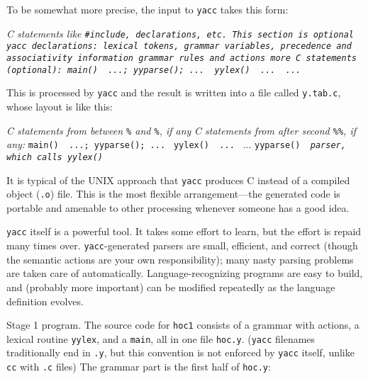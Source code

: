 To be somewhat more precise, the input to {\tt yacc} takes
this form:

\begincode
\it C statements like \tt#include\it, declarations, etc. This section is optional\tt
\begingroup\it yacc declarations: lexical tokens, grammar variables,
\quad precedence and associativity information\endgroup
\begingroup\it grammar rules and actions\endgroup
\begingroup\it more C statements (optional):\endgroup
main() { ...; yyparse(); ... }
yylex() { ... }
...
\endcode

\noindent
This is processed by {\tt yacc} and the result is written into
a file called {\tt y.tab.c}, whose layout is like this:

\smallbreak
\begingroup
\obeylines
{\it C statements from between {\tt\%\ocb} and {\tt\%\ccb}, if any}
{\it C statements from after second {\tt\%\%}, if any:}
{\tt main() \ocb\ ...; yyparse(); ... \ccb}
{\tt yylex() \ocb\ ... \ccb}
...
{\tt yyparse() \ocb\ \it parser, which calls \tt yylex() \ccb}
\endgroup
\smallskip

It is typical of the {\sc UNIX} approach that {\tt yacc} produces
C instead of a compiled object ({\tt.o}) file. This is the most
flexible arrangement---the generated code is portable and amenable
to other processing whenever someone has a good idea.

{\tt yacc} itself is a powerful tool. It takes some effort to learn,
but the effort is repaid many times over. {\tt yacc}-generated parsers
are small, efficient, and correct (though the semantic actions are
your own responsibility); many nasty parsing problems are taken
care of automatically. Language-recognizing programs are easy
to build, and (probably more important) can be modified repeatedly
as the language definition evolves.

\subsect Stage 1 program.
The source code for {\tt hoc1} consists of a grammar with actions,
a lexical routine {\tt yylex}, and a {\tt main}, all in one file
{\tt hoc.y}. ({\tt yacc} filenames traditionally end in {\tt.y},
but this convention is not enforced by {\tt yacc} itself, unlike
{\tt cc} with {\tt.c} files) The grammar part is the first half of
{\tt hoc.y}:

